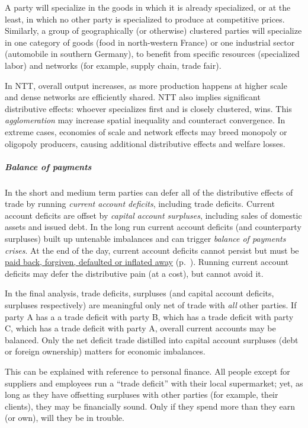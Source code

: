 \begin{description}
	A party will specialize in the goods in which it is already specialized, or at the least, in which no other party is specialized to produce at competitive prices.
	Similarly, a group of geographically (or otherwise) clustered parties will specialize in one category of goods (food in north-western France) or one industrial sector (automobile in southern Germany), to benefit from specific resources (specialized labor) and networks (for example, supply chain, trade fair).

	In \gls{NTT}, overall output increases, as more production happens at higher scale and dense networks are efficiently shared.
	\gls{NTT} also implies significant distributive effects:
	whoever specializes first and is closely clustered, wins.
	This \emph{agglomeration} may increase spatial inequality and counteract convergence.
	In extreme cases, economies of scale and network effects may breed monopoly or oligopoly producers, causing additional distributive effects and welfare losses.
\end{description}

\subparagraph{Balance of payments}
In the short and medium term parties can defer all of the distributive effects of trade by running \emph{current account deficits}, including trade deficits.
Current account deficits are offset by \emph{capital account surpluses}, including sales of domestic assets and issued debt.
In the long run current account deficits (and counterparty surpluses) built up untenable imbalances and can trigger \emph{balance of payments crises}.
At the end of the day, current account deficits cannot persist but must be \hyperref[sec:imbalances]{paid back, forgiven, defaulted or inflated away} (p.~\pageref{sec:imbalances}).
Running current account deficits may defer the distributive pain (at a cost), but cannot avoid it.

In the final analysis, trade deficits, surpluses (and capital account deficits, surpluses respectively) are meaningful only net of trade with \emph{all} other parties.
If party A has a a trade deficit with party B, which has a trade deficit with party C, which has a trade deficit with party A, overall current accounts may be balanced.
Only the net deficit trade distilled into capital account surpluses (debt or foreign ownership) matters for economic imbalances.

This can be explained with reference to personal finance.
All people except for suppliers and employees run a ``trade deficit'' with their local supermarket;
yet, as long as they have offsetting surpluses with other parties (for example, their clients), they may be financially sound.
Only if they spend more than they earn (or own), will they be in trouble.%

